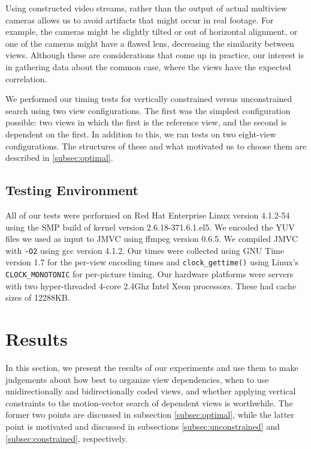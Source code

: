\documentclass{sig-alternate-05-2015}
\begin{document}
Using constructed video streams, rather than the output of actual multiview
cameras allows us to avoid artifacts that might occur in real footage. For
example, the cameras might be slightly tilted or out of horizontal alignment,
or one of the cameras might have a flawed lens, decreasing the similarity
between views. Although these are considerations that come up in practice,
our interest is in gathering data about the common case, where the views
have the expected correlation.

We performed our timing tests for vertically constrained versus unconstrained
search using two view configurations. The first was the simplest configuration
possible: two views in which the first is the reference view, and the second
is dependent on the first. In addition to this, we ran tests on two eight-view
configurations. The structures of these and what motivated us to choose them
are described in \ref{subsec:optimal}.

\subsection{Testing Environment}
\label{subsec:environment}
All of our tests were performed on Red Hat Enterprise Linux version 4.1.2-54
using the SMP build of kernel version 2.6.18-371.6.1.el5. We encoded the YUV
files we used as input to JMVC using ffmpeg version 0.6.5. We compiled JMVC
with {\tt -O2} using gcc version 4.1.2. Our times were collected using GNU Time
version 1.7 for the per-view encoding times and {\tt clock\_gettime()} using
Linux's {\tt CLOCK\_MONOTONIC} for per-picture timing. Our hardware platforms
were servers with two hyper-threaded 4-core 2.4Ghz Intel Xeon processors. These
had cache sizes of 12288KB.

\section{Results} %
\label{sec:results} %
In this section, we present the results of our experiments and use them to make
judgements about how best to organize view dependencies, when to use
unidirectionally and bidirectionally coded views, and whether applying vertical
constraints to the motion-vector search of dependent views is worthwhile. The
former two points are discussed in subsection \ref{subsec:optimal}, while the
latter point is motivated and discussed in subsections
\ref{subsec:unconstrained} and \ref{subsec:constrained}, respectively.
\end{document}
